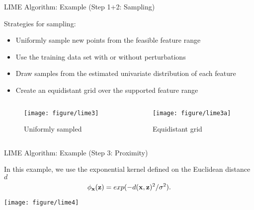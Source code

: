 \documentclass[11pt,compress,t,notes=noshow, aspectratio=169, xcolor=table]{beamer}
\begin{document}
\begin{frame}[c]{LIME Algorithm: Example (Step 1+2: Sampling) }
		
		Strategies for sampling: 
		\begin{itemize} 
			\item Uniformly sample new points from the feasible feature range 
			\item Use the training data set with or without perturbations
			\item Draw samples from the estimated univariate distribution of each feature
			\item Create an equidistant grid over the supported feature range  
		\end{itemize}
		\vspace{-.5cm}
		\begin{columns}
        \begin{column}{0.5\textwidth}  %
            \begin{figure}
             \texttt{[image: figure/lime3]} 
             \vspace{-0.3cm}
             \caption{Uniformly sampled}
             \end{figure}
        \end{column}
        \begin{column}{0.5\textwidth}  %
		    \begin{figure}
			\texttt{[image: figure/lime3a]}
			  \vspace{-0.3cm}
    		    \caption{Equidistant grid}
    		\end{figure}   
    \end{column}
\end{columns}
\end{frame}
		
\begin{frame}{LIME Algorithm: Example (Step 3: Proximity) }

	In this example, we use the exponential kernel defined on the Euclidean distance $d$
		 $$\phi_{\mathbf{x}}(\mathbf{z}) = exp(-d(\mathbf{x}, \mathbf{z})^2/\sigma^2).$$ 
		\begin{center}
			\texttt{[image: figure/lime4]}
		\end{center}
		
		
\end{frame}
		
\end{document}
